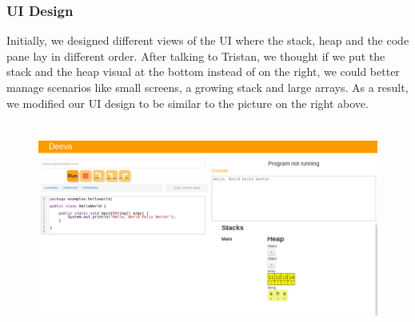\documentclass[11pt, a4paper]{article}
\begin{document}
\subsubsection{UI Design}
\begin{figure}[h!]
\centering
{}
\quad
{}
\end{figure}

Initially, we designed different views of the UI where the stack, heap and the code pane lay in different order.
After talking to Tristan, we thought if we put the stack and the heap visual at the bottom instead of on the right, we could better manage scenarios like small screens, a growing stack and large arrays.
As a result, we modified our UI design to be similar to the picture on the right above.\\
\begin{figure}[h!]
\centering
\includegraphics[height=70mm,width=130mm]{finalDesign.png}
\end{figure}
\end{document}
